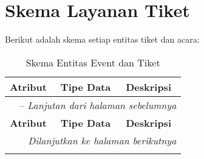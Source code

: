 \chapter{Skema Layanan Tiket}
\label{apx:ticket-schema}

Berikut adalah skema setiap entitas tiket dan acara:

\begingroup
\footnotesize
\begin{longtable}{|l|p{}|p{}|}
	\caption{Skema Entitas Event dan Tiket} 																																	\\
	\hline
	\textbf{Atribut} & \textbf{Tipe Data} & \textbf{Deskripsi} 																																	\\
	\endfirsthead

	\multicolumn{3}{|l|}{\tablename\ \thetable\ -- \textit{Lanjutan dari halaman sebelumnya}} 																																	\\
	\hline
	\textbf{Atribut} & \textbf{Tipe Data} & \textbf{Deskripsi} 																																	\\
	\endhead

	\hline
	\multicolumn{3}{|r|}{\textit{Dilanjutkan ke halaman berikutnya}} 																																	\\
	\endfoot

	\hline
	\endlastfoot


\end{longtable}
